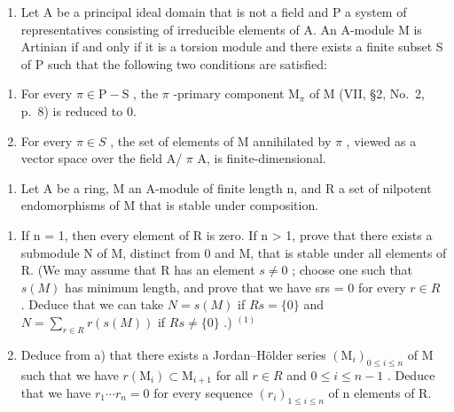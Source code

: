 
\begin{enumerate}
\def\labelenumi{\arabic{enumi})}
\tightlist
\item
  Let A be a principal ideal domain that is not a field and P a system of representatives consisting of irreducible elements of A. An A-module M is Artinian if and only if it is a torsion module and there exists a finite subset S of P such that the following two conditions are satisfied:
\end{enumerate}

\begin{enumerate}
\def\labelenumi{(\roman{enumi})}
\item
  For every \(\pi \in \mathrm{P} - \mathrm{S}\) , the \(\pi\) -primary component \(\mathrm{M}_{\pi}\) of \(\mathrm{M}\) (VII, §2, No.~2, p.~8) is reduced to 0.
\item
  For every \(\pi\in S\) , the set of elements of M annihilated by \(\pi\) , viewed as a vector space over the field A/ \(\pi\) A, is finite-dimensional.
\end{enumerate}

\begin{enumerate}
\def\labelenumi{\arabic{enumi})}
\setcounter{enumi}{1}
\tightlist
\item
  Let A be a ring, M an A-module of finite length n, and R a set of nilpotent endomorphisms of M that is stable under composition.
\end{enumerate}

\begin{enumerate}
\def\labelenumi{\alph{enumi})}
\item
  If n = 1, then every element of R is zero. If n \textgreater{} 1, prove that there exists a submodule N of M, distinct from 0 and M, that is stable under all elements of R. (We may assume that R has an element \(s \neq 0\) ; choose one such that \(s(M)\) has minimum length, and prove that we have srs = 0 for every \(r \in R\) . Deduce that we can take \(N = s(M)\) if \(Rs = \{0\}\) and \(N = \sum_{r \in R} r(s(M))\) if \(Rs \neq \{0\}\) .) \(^{(1)}\)
\item
  Deduce from a) that there exists a Jordan--Hölder series \((\mathrm{M}_{i})_{0\leqslant i\leqslant n}\) of M such that we have \(r(\mathrm{M}_{i})\subset\mathrm{M}_{i+1}\) for all \(r\in R\) and \(0\leqslant i\leqslant n-1\) . Deduce that we have \(r_{1}\cdots r_{n}=0\) for every sequence \((r_{i})_{1\leqslant i\leqslant n}\) of n elements of R.
\end{enumerate}

